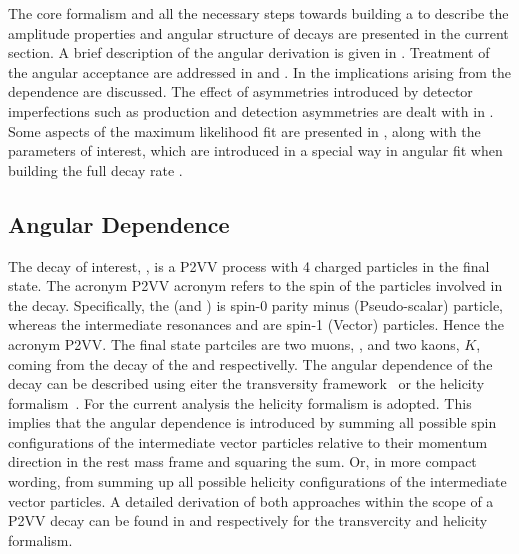 
The core formalism and all the necessary steps towards building a \pdf to describe the amplitude properties and angular structure of \BJpsiKst decays are presented in
the current section. A brief description of the angular \pdf derivation is given in .
Treatment of the angular acceptance are addressed in  and .
In  the implications arising from the \mkpi dependence are discussed.
The effect of asymmetries introduced by detector imperfections such as production and detection asymmetries are dealt with
in . Some aspects of the maximum likelihood fit are presented in ,
along with the \ACP parameters of interest, which are introduced in a special way in angular fit when building the full decay rate \pdf.


\subsection{Angular Dependence}
\label{Diferential_Decay_Rate}

The decay of interest, \BJpsiKst, is a P2VV process with 4 charged particles in the final state.
The acronym P2VV acronym refers to the spin of the particles involved in the decay.
Specifically, the \Bs (and \Bd) is spin-0 parity minus (Pseudo-scalar) particle, whereas the intermediate resonances
\jpsi and \Kstarzb are spin-1 (Vector) particles. Hence the acronym P2VV. The final state partciles are
two muons, \mmu, and two kaons, $K$, coming from the decay of the \jpsi and \Kstarzb respectivelly.
The angular dependence of the \BsJpsiKst decay can be described using eiter the transversity framework~\cite{transvFrameworkI,transvFrameworkII}
or the helicity formalism~\cite{helicityFormI,helicityFormII}. For the current analysis the helicity
formalism is adopted. This implies that the angular dependence is introduced by summing all possible
spin configurations of the intermediate vector particles relative to their momentum direction in the
\Bs rest mass frame and squaring the sum. Or, in more compact wording, from summing up all possible
helicity configurations of the intermediate vector particles. A detailed derivation of both approaches
within the scope of a P2VV decay can be found in \cite{daanThesis} and \cite{jeroenThesis} respectively
for the transvercity and helicity formalism.

